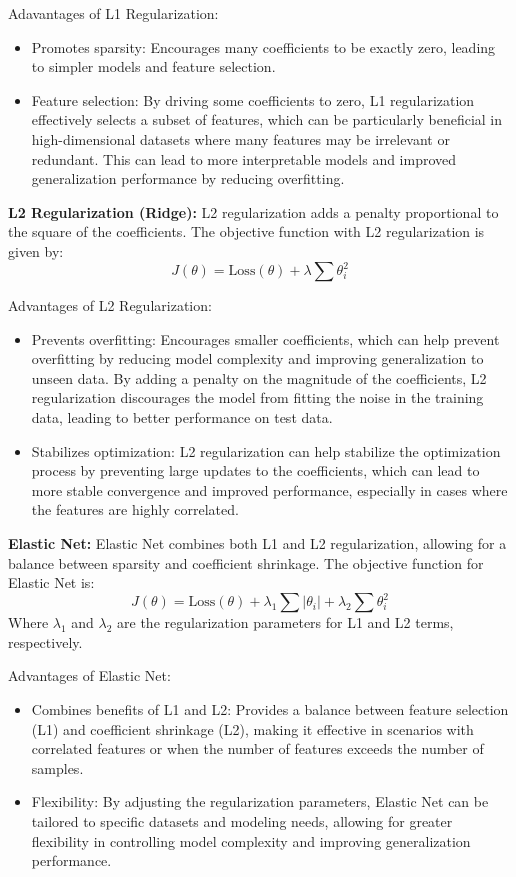 \documentclass[
  letterpaper,
  DIV=11,
  numbers=noendperiod]{scrreprt}
\providecommand{\tightlist}{%
  \setlength{\itemsep}{0pt}\setlength{\parskip}{0pt}}
\begin{document}
Adavantages of L1 Regularization:

\begin{itemize}
\tightlist
\item
  Promotes sparsity: Encourages many coefficients to be exactly zero,
  leading to simpler models and feature selection.
\item
  Feature selection: By driving some coefficients to zero, L1
  regularization effectively selects a subset of features, which can be
  particularly beneficial in high-dimensional datasets where many
  features may be irrelevant or redundant. This can lead to more
  interpretable models and improved generalization performance by
  reducing overfitting.
\end{itemize}

\textbf{L2 Regularization (Ridge):} L2 regularization adds a penalty
proportional to the square of the coefficients. The objective function
with L2 regularization is given by: \[
J(\theta) = \text{Loss}(\theta) + \lambda \sum \theta_i^2
\]

Advantages of L2 Regularization:

\begin{itemize}
\item
  Prevents overfitting: Encourages smaller coefficients, which can help
  prevent overfitting by reducing model complexity and improving
  generalization to unseen data. By adding a penalty on the magnitude of
  the coefficients, L2 regularization discourages the model from fitting
  the noise in the training data, leading to better performance on test
  data.
\item
  Stabilizes optimization: L2 regularization can help stabilize the
  optimization process by preventing large updates to the coefficients,
  which can lead to more stable convergence and improved performance,
  especially in cases where the features are highly correlated.
\end{itemize}

\textbf{Elastic Net:} Elastic Net combines both L1 and L2
regularization, allowing for a balance between sparsity and coefficient
shrinkage. The objective function for Elastic Net is: \[
J(\theta) = \text{Loss}(\theta) + \lambda_1 \sum |\theta_i| + \lambda_2 \sum \theta_i^2
\] Where \(\lambda_1\) and \(\lambda_2\) are the regularization
parameters for L1 and L2 terms, respectively.

Advantages of Elastic Net:

\begin{itemize}
\item
  Combines benefits of L1 and L2: Provides a balance between feature
  selection (L1) and coefficient shrinkage (L2), making it effective in
  scenarios with correlated features or when the number of features
  exceeds the number of samples.
\item
  Flexibility: By adjusting the regularization parameters, Elastic Net
  can be tailored to specific datasets and modeling needs, allowing for
  greater flexibility in controlling model complexity and improving
  generalization performance.
\end{itemize}
\end{document}
